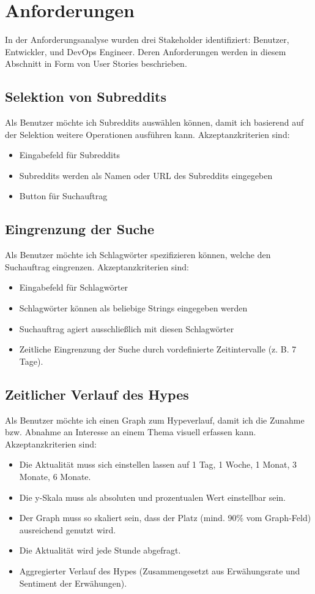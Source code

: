 \documentclass[a4paper, 10pt, conference]{ieeeconf}
\begin{document}
\section{Anforderungen} \label{s:anforderungen}

In der Anforderungsanalyse wurden drei Stakeholder identifiziert: Benutzer, Entwickler, und DevOps Engineer.  Deren Anforderungen werden in diesem Abschnitt in Form von User Stories beschrieben.

\subsection{Selektion von Subreddits}

Als Benutzer möchte ich Subreddits auswählen können, damit ich basierend auf der Selektion weitere Operationen ausführen kann. Akzeptanzkriterien sind:
\begin{itemize}
\item Eingabefeld für Subreddits
\item Subreddits werden als Namen oder URL des Subreddits eingegeben
\item Button für Suchauftrag
\end{itemize}

\subsection{Eingrenzung der Suche}

Als Benutzer möchte ich Schlagwörter spezifizieren können, welche den Suchauftrag eingrenzen. Akzeptanzkriterien sind:
\begin{itemize}
\item Eingabefeld für Schlagwörter
\item Schlagwörter können als beliebige Strings eingegeben werden
\item Suchauftrag agiert ausschließlich mit diesen Schlagwörter
\item Zeitliche Eingrenzung der Suche durch vordefinierte Zeitintervalle (z. B. 7 Tage).
\end{itemize}

\subsection{Zeitlicher Verlauf des Hypes}

Als Benutzer möchte ich einen Graph zum Hypeverlauf, damit ich die Zunahme bzw. Abnahme an Interesse an einem Thema visuell erfassen kann. Akzeptanzkriterien sind:
\begin{itemize}
\item Die Aktualität muss sich einstellen lassen auf 1 Tag, 1 Woche, 1 Monat, 3 Monate, 6 Monate.
\item Die y-Skala muss als absoluten und prozentualen Wert einstellbar sein.
\item Der Graph muss so skaliert sein, dass der Platz (mind. 90\% vom Graph-Feld) ausreichend genutzt wird.
\item Die Aktualität wird jede Stunde abgefragt.
\item Aggregierter Verlauf des Hypes (Zusammengesetzt aus Erwähungsrate und Sentiment der Erwähungen).
\end{itemize}
\end{document}
